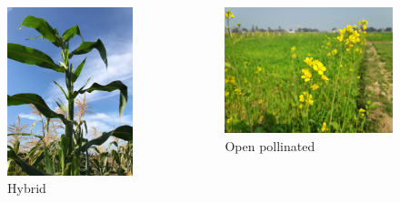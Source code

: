 \documentclass[11pt,ignorenonframetext,aspectratio=169]{beamer}
\begin{document}
\begin{frame}{}
\protect\hypertarget{section-5}{}
\begin{columns}[T,onlytextwidth]
  
  \footnotesize

\begin{figure}
\includegraphics[width=0.6\linewidth]{./images/Teosinte_maize_hybrid_cross} \caption{Hybrid}\label{fig:hybrid}
\end{figure}

  \footnotesize
  
\begin{figure}
\includegraphics[width=0.8\linewidth]{./images/cross_pollinated_mustard} \caption{Open pollinated}\label{fig:openpollinated}
\end{figure}

\end{columns}
\end{frame}
\end{document}
